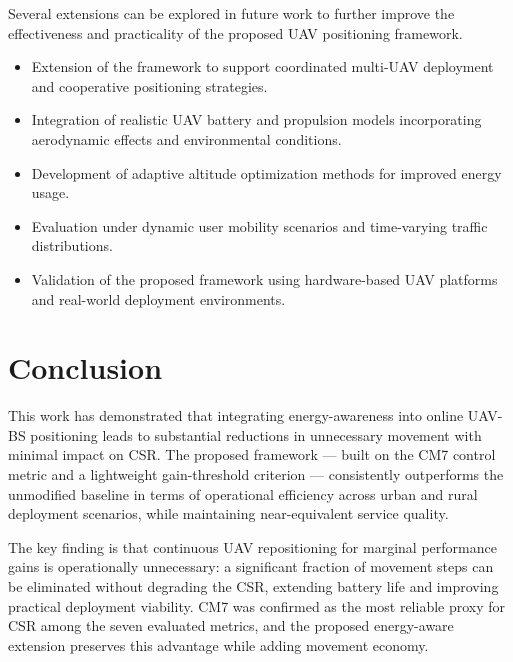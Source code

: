 \documentclass[12pt]{report}
\begin{document}
Several extensions can be explored in future work to further improve the effectiveness and practicality of the proposed UAV positioning framework.

\begin{itemize}
    \item Extension of the framework to support coordinated multi-UAV deployment and cooperative positioning strategies.
    
    \item Integration of realistic UAV battery and propulsion models incorporating aerodynamic effects and environmental conditions.
    
    \item Development of adaptive altitude optimization methods for improved energy usage.
    
    \item Evaluation under dynamic user mobility scenarios and time-varying traffic distributions.
    
    \item Validation of the proposed framework using hardware-based UAV platforms and real-world deployment environments.
\end{itemize}


\chapter{Conclusion}

This work has demonstrated that integrating energy-awareness into online UAV-BS positioning leads to substantial reductions in unnecessary movement with minimal impact on CSR. The proposed framework --- built on the CM7 control metric and a lightweight gain-threshold criterion --- consistently outperforms the unmodified baseline in terms of operational efficiency across urban and rural deployment scenarios, while maintaining near-equivalent service quality.

The key finding is that continuous UAV repositioning for marginal performance gains is operationally unnecessary: a significant fraction of movement steps can be eliminated without degrading the CSR, extending battery life and improving practical deployment viability. CM7 was confirmed as the most reliable proxy for CSR among the seven evaluated metrics, and the proposed energy-aware extension preserves this advantage while adding movement economy.
\end{document}
